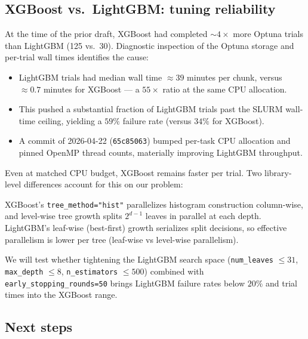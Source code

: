 \subsection{XGBoost vs.\ LightGBM: tuning reliability}
\label{sec:xgb_vs_lgbm_reliability}

At the time of the prior draft, XGBoost had completed $\sim\!4\times$
more Optuna trials than LightGBM (125 vs.\ 30). Diagnostic inspection
of the Optuna storage and per-trial wall times identifies the cause:

\begin{itemize}
    \item LightGBM trials had median wall time $\approx 39$ minutes
      per chunk, versus $\approx 0.7$ minutes for XGBoost --- a
      $55\times$ ratio at the same CPU allocation.
    \item This pushed a substantial fraction of LightGBM trials past
      the SLURM wall-time ceiling, yielding a $59\%$ failure rate
      (versus $34\%$ for XGBoost).
    \item A commit of 2026-04-22 (\texttt{65c85063}) bumped
      per-task CPU allocation and pinned OpenMP thread counts,
      materially improving LightGBM throughput.
\end{itemize}

Even at matched CPU budget, XGBoost remains faster per trial. Two
library-level differences account for this on our problem:

XGBoost's \texttt{tree\_method="hist"} parallelizes histogram construction column-wise, and level-wise tree growth splits $2^{d-1}$ leaves in parallel at each depth. LightGBM's leaf-wise (best-first) growth serializes split decisions, so effective parallelism is lower per tree (leaf-wise vs level-wise parallelism).

We will test whether tightening the LightGBM search space
(\texttt{num\_leaves} $\le 31$, \texttt{max\_depth} $\le 8$,
\texttt{n\_estimators} $\le 500$) combined with
\texttt{early\_stopping\_rounds=50} brings LightGBM failure rates
below $20\%$ and trial times into the XGBoost range.

\subsection{Next steps}
\label{sec:meeting_next_steps}

